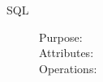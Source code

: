 \begin{description}
\item[SQL]\hfill
\begin{description}
\item[Purpose:]
\item[Attributes:]
\item[Operations:]
\end{description}
\end{description}